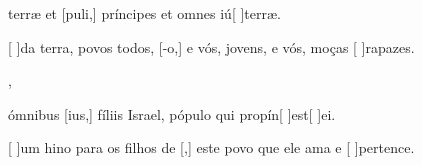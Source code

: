 {  {\item {} terræ et [puli,] príncipes et omnes iú[ ]{ter}ræ.~\Antiphona}%
    {\item {}[ ]{da} terra, povos todos, [-o,] e vós, jovens, e vós, moças [ ]{ra}{pa}zes.~\Antiphona},
  {\item {} ómnibus [ius,] fíliis Israel, pópulo qui propín[ ]{est}[ ]{e}i.~\Antiphona}%
    {\item {}[ ]{um} hino para os filhos de [,] este povo que ele ama e [ ]{per}{ten}ce.~\Antiphona}
}